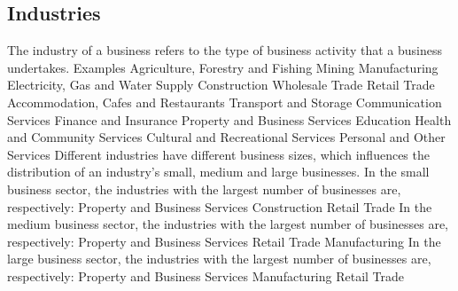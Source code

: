 \subsection{Industries}
\begin{outline}
\1 The industry of a business refers to the type of business activity that a business undertakes.
\2 Examples
\3 Agriculture, Forestry and Fishing
\3 Mining
\3 Manufacturing
\3 Electricity, Gas and Water Supply
\3 Construction
\3 Wholesale Trade
\3 Retail Trade
\3 Accommodation, Cafes and Restaurants
\3 Transport and Storage
\3 Communication Services
\3 Finance and Insurance
\3 Property and Business Services
\3 Education
\3 Health and Community Services
\3 Cultural and Recreational Services
\3 Personal and Other Services
\1 Different industries have different business sizes, which influences the distribution of an industry's small, medium and large businesses.
\2 In the small business sector, the industries with the largest number of businesses are, respectively:
\3 Property and Business Services
\3 Construction
\3 Retail Trade
\2 In the medium business sector, the industries with the largest number of businesses are, respectively:
\3 Property and Business Services
\3 Retail Trade
\3 Manufacturing
\2 In the large business sector, the industries with the largest number of businesses are, respectively:
\3 Property and Business Services
\3 Manufacturing
\3 Retail Trade
\end{outline}